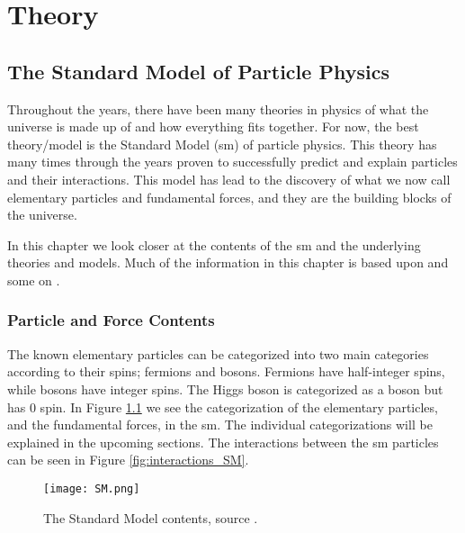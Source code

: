 \documentclass[a4paper, american, 12pt]{report}
\begin{document}

	\part{Theory}
	\label{part:Theory}
	
	\chapter{The Standard Model of Particle Physics}
	\label{chap:Theory-SM}
	Throughout the years, there have been many theories in physics of what the universe is made up of and how everything fits together. For now, the best theory/model is the Standard Model (\acrshort{sm}) of particle physics. This theory has many times through the years proven to successfully predict and explain particles and their interactions. This model has lead to the discovery of what we now call elementary particles and fundamental forces, and they are the building blocks of the universe.
	
	In this chapter we look closer at the contents of the \acrshort{sm} and the underlying theories and models. Much of the information in this chapter is based upon \citet{thomson2013modern} and some on \citet{PhysicsHypertextbook}.
	
	
	\section{Particle and Force Contents}
	\label{sect:Theory-Particles}
	The known elementary particles can be categorized into two main categories according to their spins; fermions and bosons. Fermions have half-integer spins, while bosons have integer spins. The Higgs boson is categorized as a boson but has 0 spin. In Figure \ref{fig:SM} we see the categorization of the elementary particles, and the fundamental forces, in the \acrshort{sm}. The individual categorizations will be explained in the upcoming sections. The interactions between the \acrshort{sm} particles can be seen in Figure \ref{fig:interactions_SM}.
	
	\begin{figure}[ht!]
		\vspace{-1.0cm}
		\hspace*{-2.2cm}
		\centering\texttt{[image: SM.png]}
		\caption[The Standard Model.]{The Standard Model contents, source \cite{SM}.\label{fig:SM}}
	\end{figure} 
\end{document}
